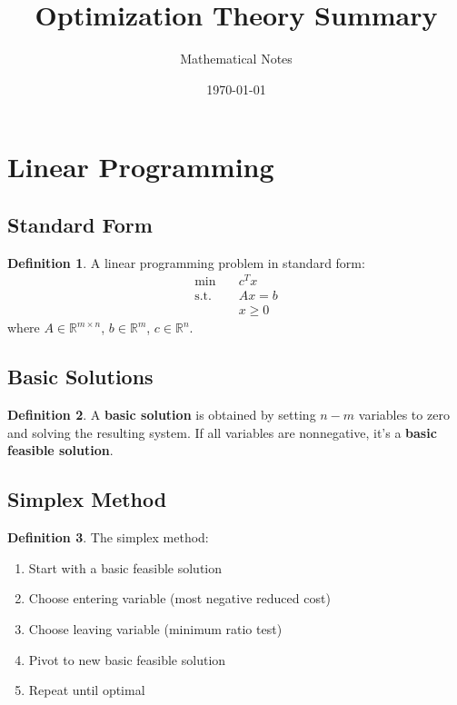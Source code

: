 \documentclass[11pt]{article}
\title{Optimization Theory Summary}
\author{Mathematical Notes}
\date{\today}
\theoremstyle{definition}
\newtheorem{definition}{Definition}[section]
\begin{document}
\maketitle

\tableofcontents
\newpage

\section{Linear Programming}

\subsection{Standard Form}
\begin{definition}
A linear programming problem in standard form:
\begin{align}
\min \quad & c^T x \\
\text{s.t.} \quad & Ax = b \\
& x \geq 0
\end{align}
where $A \in \mathbb{R}^{m \times n}$, $b \in \mathbb{R}^m$, $c \in \mathbb{R}^n$.
\end{definition}

\subsection{Basic Solutions}
\begin{definition}
A \textbf{basic solution} is obtained by setting $n-m$ variables to zero and solving the resulting system. If all variables are nonnegative, it's a \textbf{basic feasible solution}.
\end{definition}

\subsection{Simplex Method}
\begin{definition}
The simplex method:
\begin{enumerate}
    \item Start with a basic feasible solution
    \item Choose entering variable (most negative reduced cost)
    \item Choose leaving variable (minimum ratio test)
    \item Pivot to new basic feasible solution
    \item Repeat until optimal
\end{enumerate}
\end{definition}
\end{document}
